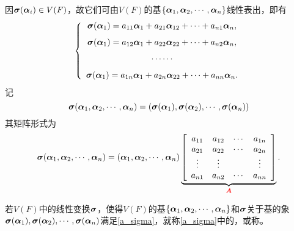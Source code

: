 \begin{frame}
  因$\boldsymbol{\sigma}(\boldsymbol{\alpha}_i)\in V(F)$，故它们可由$V(F)$的基$\{\boldsymbol{\alpha}_1,\boldsymbol{\alpha}_2,\cdots,\boldsymbol{\alpha}_n\}$线性表出，即有
  $$
  \left\{
    \begin{array}{c}
      \boldsymbol{\sigma}(\boldsymbol{\alpha}_1)=a_{11}\boldsymbol{\alpha}_{1}+a_{21}\boldsymbol{\alpha}_{12}+\cdots+a_{n1}\boldsymbol{\alpha}_{n}, \\[0.1in]
      \boldsymbol{\sigma}(\boldsymbol{\alpha}_1)=a_{12}\boldsymbol{\alpha}_{1}+a_{22}\boldsymbol{\alpha}_{22}+\cdots+a_{n2}\boldsymbol{\alpha}_{n}, \\[0.1in]
      \cdots\cdots\\[0.1in]
      \boldsymbol{\sigma}(\boldsymbol{\alpha}_1)=a_{1n}\boldsymbol{\alpha}_{1}+a_{2n}\boldsymbol{\alpha}_{22}+\cdots+a_{nn}\boldsymbol{\alpha}_{n}.
    \end{array}
  \right.
  $$
  记
  $$
  \boldsymbol{\sigma}(\boldsymbol{\alpha}_1,\boldsymbol{\alpha}_2,\cdots,\boldsymbol{\alpha}_n)=(\boldsymbol{\sigma}(\boldsymbol{\alpha}_1),\boldsymbol{\sigma}(\boldsymbol{\alpha}_2),\cdots,\boldsymbol{\sigma}(\boldsymbol{\alpha}_n))
  $$
  其矩阵形式为
  \begin{equation}\label{a_sigma}
  \boldsymbol{\sigma}(\boldsymbol{\alpha}_1,\boldsymbol{\alpha}_2,\cdots,\boldsymbol{\alpha}_n)=(\boldsymbol{\alpha}_1,\boldsymbol{\alpha}_2,\cdots,\boldsymbol{\alpha}_n)\underbrace{\left[
    \begin{array}{cccc}
      a_{11}&a_{12}&\cdots&a_{1n}\\
      a_{21}&a_{22}&\cdots&a_{2n}\\
      \vdots&\vdots&&\vdots\\
      a_{n1}&a_{n2}&\cdots&a_{nn}
    \end{array}
  \right]}_{\textcolor{red}{\boldsymbol{A}}}.
  \end{equation}

\end{frame}

\begin{frame}
  \begin{dingyi}
    若$V(F)$中的线性变换$\boldsymbol{\sigma}$，使得$V(F)$的基$\{\boldsymbol{\alpha}_1,\boldsymbol{\alpha}_2,\cdots,\boldsymbol{\alpha}_n\}$和$\boldsymbol{\sigma}$关于基的象$\boldsymbol{\sigma}(\boldsymbol{\alpha}_1),\boldsymbol{\sigma}(\boldsymbol{\alpha}_2),\cdots,\boldsymbol{\sigma}(\boldsymbol{\alpha}_n)$满足\eqref{a_sigma}，就称\eqref{a_sigma}中的，或称。
  \end{dingyi}
\end{frame}

